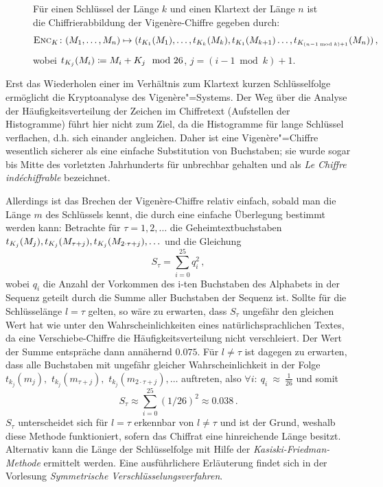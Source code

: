 \begin{figure}[h]
	Für einen Schlüssel der Länge $k$ und einen Klartext der Länge $n$ ist die Chiffrierabbildung der Vigenère-Chiffre gegeben durch:
	\begin{align*}
		\textsc{Enc}_{K}\colon (M_1,\ldots,M_{n}) \mapsto (t_{K_1}(M_1),\ldots,t_{K_{k}}(M_{k}),t_{K_1}(M_{k+1})\ldots,t_{K_{(n-1 \bmod k)+1}}(M_{n}))\, ,
	\end{align*}
	wobei $t_{K_{j}}(M_{i}) \coloneqq M_{i} + K_{j} \mod 26$, $j = (i-1 \bmod k)+1$.
\end{figure}
Erst das Wiederholen einer im Verhältnis zum Klartext kurzen Schlüsselfolge ermöglicht die Kryptoanalyse des Vigenère"=Systems.
Der Weg über die Analyse der Häufigkeitsverteilung der Zeichen im Chiffretext (Aufstellen der Histogramme) führt hier nicht zum Ziel, da die Histogramme für
lange Schlüssel verflachen, d.h. sich einander angleichen. Daher ist eine Vigenère"=Chiffre wesentlich sicherer als eine einfache Substitution von
Buchstaben; sie wurde sogar bis Mitte des vorletzten Jahrhunderts für unbrechbar gehalten und als \emph{Le Chiffre indéchiffrable} bezeichnet.

Allerdings ist das Brechen der Vigenère-Chiffre relativ einfach, sobald man die Länge $m$ des Schlüssels kennt, die durch eine einfache Überlegung bestimmt werden kann: Betrachte für $\tau = 1,2,\ldots$ die Geheimtextbuchstaben $t_{K_j}(M_j),t_{K_j}(M_{\tau+j}),t_{K_j}(M_{2 \cdot \tau+j}),\ldots$ und die Gleichung
\begin{equation*}
	S_{\tau}=	\sum_{i=0}^{25} q^2_i \, ,
\end{equation*}
wobei $q_i$ die Anzahl der Vorkommen des i-ten Buchstaben des Alphabets in der Sequenz geteilt durch die Summe aller Buchstaben der Sequenz ist. Sollte für die
Schlüsselänge $l = \tau$ gelten, so wäre zu erwarten, dass $S_{\tau}$ ungefähr den gleichen Wert hat wie unter den Wahrscheinlichkeiten eines
natürlichsprachlichen Textes, da eine Verschiebe-Chiffre die Häufigkeitsverteilung nicht verschleiert. Der Wert der Summe entspräche dann annähernd $0.075$.
Für $l \neq \tau$ ist dagegen zu erwarten, dass alle Buchstaben mit ungefähr gleicher Wahrscheinlichkeit in der Folge $t_{k_j}(m_j),$ $t_{k_j}(m_{\tau+j}),$ $t_{k_j}(m_{2 \cdot \tau+j}),\ldots$ auftreten, also $\forall i\colon~q_i~\approx~\frac{1}{26}$ und somit
\begin{equation*}
	S_{\tau} \approx \sum_{i=0}^{25} (1/26)^2 \approx 0.038 \,\text{.}
\end{equation*}
$S_{\tau}$ unterscheidet sich für $l = \tau$ erkennbar von $l \neq \tau$
und ist der Grund, weshalb diese Methode funktioniert, sofern das
Chiffrat eine hinreichende Länge besitzt. Alternativ kann die Länge der
Schlüsselfolge mit Hilfe der \emph{Kasiski-Friedman-Methode}
\cite{Kasiski1863} ermittelt werden. Eine ausführlichere Erläuterung
findet sich in der Vorlesung \emph{Symmetrische Verschlüsselungsverfahren}\cite{Geiselmann2016}.


